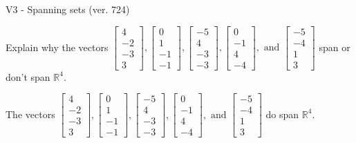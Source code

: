 \begin{exercise}
  \begin{exerciseTitle}V3 - Spanning sets (ver. 724)\end{exerciseTitle}
  \begin{exerciseStatement}
    Explain why the vectors \(\left[\begin{array}{r}
4 \\
-2 \\
-3 \\
3
\end{array}\right] , \left[\begin{array}{r}
0 \\
1 \\
-1 \\
-1
\end{array}\right] , \left[\begin{array}{r}
-5 \\
4 \\
-3 \\
-3
\end{array}\right] , \left[\begin{array}{r}
0 \\
-1 \\
4 \\
-4
\end{array}\right] , \text{ and } \left[\begin{array}{r}
-5 \\
-4 \\
1 \\
3
\end{array}\right]\) span or don't span \(\mathbb{R}^4\). 
	


  \end{exerciseStatement}
  \begin{exerciseAnswer}
   The vectors \(\left[\begin{array}{r}
4 \\
-2 \\
-3 \\
3
\end{array}\right] , \left[\begin{array}{r}
0 \\
1 \\
-1 \\
-1
\end{array}\right] , \left[\begin{array}{r}
-5 \\
4 \\
-3 \\
-3
\end{array}\right] , \left[\begin{array}{r}
0 \\
-1 \\
4 \\
-4
\end{array}\right] , \text{ and } \left[\begin{array}{r}
-5 \\
-4 \\
1 \\
3
\end{array}\right]\) 
  	 do  
	span \(\mathbb{R}^4\).
  



\end{exerciseAnswer}
\end{exercise}
